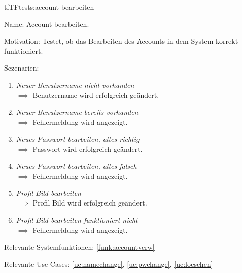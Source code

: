 \begin{description}[leftmargin=5em, style=sameline]

\begin{lhp}{tf}{TF}{tests:account bearbeiten}
	\item [Name:] Account bearbeiten.
	\item [Motivation:] Testet, ob das Bearbeiten des Accounts in dem System korrekt funktioniert.
	\item [Sczenarien:] \hfill
		\begin{enumerate}
			\item \textit{Neuer Benutzername nicht vorhanden} \\ $\implies$ Benutzername wird erfolgreich geändert.
			\item \textit{Neuer Benutzername  bereits vorhanden} \\ $\implies$ Fehlermeldung wird angezeigt.
			\item \textit{Neues Passwort bearbeiten, altes richtig} \\ $\implies$ Passwort wird erfolgreich geändert.
			\item \textit{Neues Passwort bearbeiten, altes falsch} \\ $\implies$ Fehlermeldung wird angezeigt.
			\item \textit{Profil Bild bearbeiten} \\ $\implies$ Profil Bild wird erfolgreich geändert.
			\item \textit{Profil Bild bearbeiten funktioniert nicht} \\ $\implies$ Fehlermeldung wird angezeigt.
		\end{enumerate}
	\item [Relevante Systemfunktionen:] \ref{funk:accountverw}
	\item [Relevante Use Cases:] \ref{uc:namechange}, \ref{uc:pwchange}, \ref{uc:loeschen}
\end{lhp}

\end{description}

